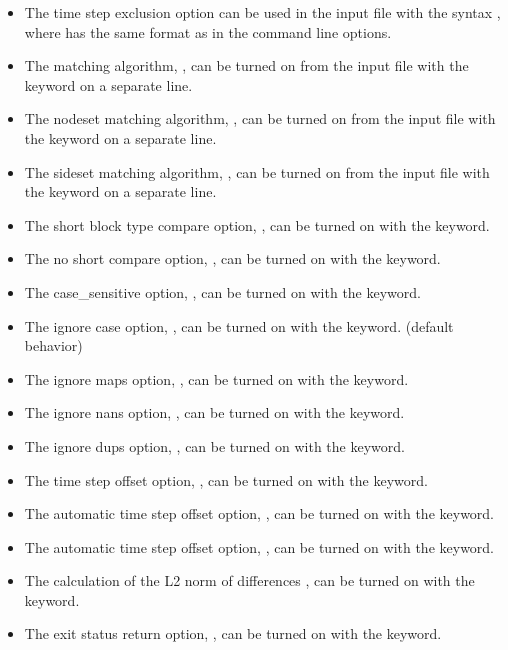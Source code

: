 \begin{itemize}
\item The time step exclusion option can be used in the input file with
           the syntax , where  has the same
           format as in the command line options.

\item  The matching algorithm, , can be turned on from the input file
           with the  keyword on a separate line.

\item  The nodeset matching algorithm, , can be turned on from the
           input file with the  keyword on a separate line.
\item  The sideset matching algorithm, , can be turned on from the
           input file with the  keyword on a separate line.
\item  The short block type compare option, , can be turned on with the
	 keyword.
\item  The no short compare option, , can be turned on with the
            keyword.
\item  The case\_sensitive option, , can be turned on with the
            keyword.
\item  The ignore case option, , can be turned on with the
            keyword. (default behavior)
\item  The ignore maps option, , can be turned on with the
            keyword.
\item  The ignore nans option, , can be turned on with the
            keyword.
\item  The ignore dups option, , can be turned on with the
            keyword.
\item  The time step offset option, , can be turned on with the 
            keyword.
\item  The automatic time step offset option, , can be turned
           on with the  keyword.
\item  The automatic time step offset option, , can be turned
           on with the  keyword.
\item  The calculation of the L2 norm of differences , can be turned
           on with the  keyword.
\item  The exit status return option, , can be turned on with the 
            keyword.
\end{itemize}
